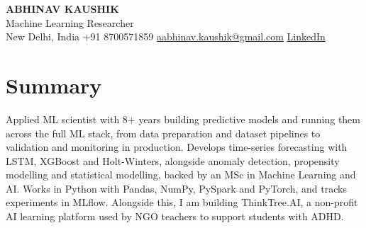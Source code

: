 \documentclass[10pt,a4paper]{article}
\begin{document}
\begin{center}
  {\LARGE\bfseries ABHINAV KAUSHIK}\\[2pt]
  {\large Machine Learning Researcher}\\[2pt]
  New Delhi, India \textbar{} +91 8700571859 \textbar{} \href{mailto:aabhinav.kaushik@gmail.com}{aabhinav.kaushik@gmail.com} \textbar{} \href{https://www.linkedin.com/in/abhinav-kaushik10/}{LinkedIn}  
\end{center}

\section{Summary}
Applied ML scientist with 8+ years building predictive models and running them across the full ML stack, from data preparation and dataset pipelines to validation and monitoring in production. Develops time-series forecasting with LSTM, XGBoost and Holt-Winters, alongside anomaly detection, propensity modelling and statistical modelling, backed by an MSc in Machine Learning and AI. Works in Python with Pandas, NumPy, PySpark and PyTorch, and tracks experiments in MLflow. Alongside this, I am building ThinkTree.AI, a non-profit AI learning platform used by NGO teachers to support students with ADHD.
\end{document}
